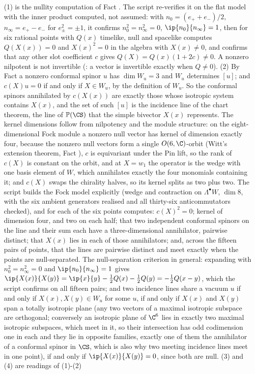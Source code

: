 (1) is the nullity computation of Fact . The script re-verifies it on the flat model with the inner product computed, not assumed: with $n_{0} = (e_{+} + e_{-})/2$, $n_{\infty} = e_{+} - e_{-}$ for $e_{\pm}^{2} = \pm 1$, it confirms $n_{0}^{2} = n_{\infty}^{2} = 0$, $\ip{n_{0}}{n_{\infty}} = 1$, then for six rational points with $Q(x)$ timelike, null and spacelike computes $Q(X(x)) = 0$ and $X(x)^{2} = 0$ in the algebra with $X(x) \neq 0$, and confirms that any other slot coefficient $c$ gives $Q(X) = Q(x)(1 + 2c) \neq 0$. A nonzero nilpotent is not invertible (: a vector is invertible exactly when $Q \neq 0$). (2) By Fact  a nonzero conformal spinor $u$ has $\dim W_{u} = 3$ and $W_{u}$ determines $[u]$; and $c(X)u = 0$ if and only if $X \in W_{u}$, by the definition of $W_{u}$. So the conformal spinors annihilated by $c(X(x))$ are exactly those whose isotropic system contains $X(x)$, and the set of such $[u]$ is the incidence line of the chart theorem, the line of $\mathbb{P}(\CS)$ that the simple bivector $X(x)$ represents. The kernel dimensions follow from nilpotency and the module structure: on the eight-dimensional Fock module a nonzero null vector has kernel of dimension exactly four, because the nonzero null vectors form a single $O(6,\C)$-orbit (Witt's extension theorem, Fact ), $c$ is equivariant under the Pin lift, so the rank of $c(X)$ is constant on the orbit, and at $X = w_{1}$ the operator is the wedge with one basis element of $W$, which annihilates exactly the four monomials containing it; and $c(X)$ swaps the chirality halves, so its kernel splits as two plus two. The script builds the Fock model explicitly (wedge and contraction on $\Lambda^{\bullet}W$, $\dim 8$, with the six ambient generators realised and all thirty-six anticommutators checked), and for each of the six points computes: $c(X)^{2} = 0$; kernel of dimension four, and two on each half; that two independent conformal spinors on the line and their sum each have a three-dimensional annihilator, pairwise distinct; that $X(x)$ lies in each of those annihilators; and, across the fifteen pairs of points, that the lines are pairwise distinct and meet exactly when the points are null-separated. The null-separation criterion in general: expanding with $n_{0}^{2} = n_{\infty}^{2} = 0$ and $\ip{n_{0}}{n_{\infty}} = 1$ gives $\ip{X(x)}{X(y)} = \ip{x}{y} - \tfrac12 Q(x) - \tfrac12 Q(y) = -\tfrac12 Q(x-y)$, which the script confirms on all fifteen pairs; and two incidence lines share a vacuum $u$ if and only if $X(x), X(y) \in W_{u}$ for some $u$, if and only if $X(x)$ and $X(y)$ span a totally isotropic plane (any two vectors of a maximal isotropic subspace are orthogonal; conversely an isotropic plane of $\C^{6}$ lies in exactly two maximal isotropic subspaces, which meet in it, so their intersection has odd codimension one in each and they lie in opposite families, exactly one of them the annihilator of a conformal spinor in $\CS$, which is also why two meeting incidence lines meet in one point), if and only if $\ip{X(x)}{X(y)} = 0$, since both are null. (3) and (4) are readings of (1)-(2) 